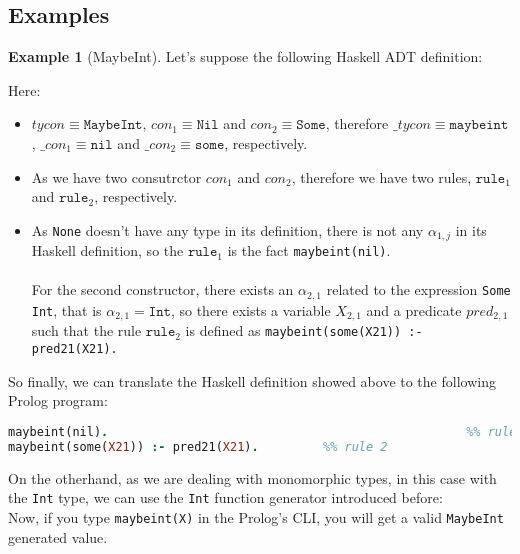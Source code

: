 \documentclass{report}
\theoremstyle{definition}
\newtheorem{example}{Example}[section]
\theoremstyle{definition}
\newcommand{\ttt}[1]{\texttt{#1}}
\begin{document}
\subsection{Examples} \label{ch:monomorphic-types-examples}
\begin{example}[MaybeInt]
	Let's suppose the following Haskell ADT definition:
	
	Here:
	\begin{itemize}
		\item $tycon \equiv \ttt{MaybeInt}$, $con_1 \equiv \ttt{Nil}$ and $con_2 \equiv \ttt{Some}$, therefore $\_tycon \equiv \ttt{maybeint}$, $\_con_1 \equiv \ttt{nil}$ and $\_con_2 \equiv \ttt{some}$, respectively.
		\item As we have two consutrctor $con_1$ and $con_2$, therefore we have two rules, $\ttt{rule}_1$ and $\ttt{rule}_2$, respectively.
		\item As \ttt{None} doesn't have any type in its definition, there is not any $\alpha_{1,j}$ in its Haskell definition, so the $\ttt{rule}_1$ is the fact \ttt{maybeint(nil)}.\\\\
		For the second constructor, there exists an $\alpha_{2,1}$ related to the expression \ttt{Some Int}, that is $\alpha_{2,1} = \ttt{Int}$, so there exists a variable $X_{2,1}$ and a predicate $pred_{2,1}$ such that the rule $\ttt{rule}_2$ is defined as \ttt{maybeint(some(X21)) :- pred21(X21).}
	\end{itemize}
	So finally, we can translate the Haskell definition showed above to the following Prolog program:\\
\begin{lstlisting}[language=Prolog]
maybeint(nil).													%% rule 1
maybeint(some(X21)) :- pred21(X21).			%% rule 2
\end{lstlisting}
On the otherhand, as we are dealing with monomorphic types, in this case with the \ttt{Int} type, we can use the \ttt{Int} function generator introduced before:\\

Now, if you type \ttt{maybeint(X)} in the Prolog's CLI, you will get a valid \ttt{MaybeInt} generated value.\\
\end{example}
\end{document}
